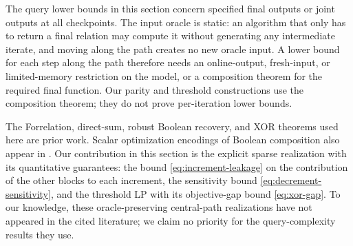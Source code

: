 The query lower bounds in this section concern specified final outputs or
joint outputs at all checkpoints.  The input oracle is static: an
algorithm that only has to return a final relation may compute it without
generating any intermediate iterate, and moving along the path creates no
new oracle input.  A lower bound for each step along the path therefore
needs an online-output, fresh-input, or limited-memory restriction on the
model, or a composition theorem for the required final function.  Our parity and threshold constructions use
the composition theorem; they do not prove per-iteration lower bounds.

The Forrelation, direct-sum, robust Boolean recovery, and XOR theorems used
here are prior work.  Scalar optimization encodings of Boolean composition
also appear in \citet{ApersGribling2026}.  Our
contribution in this section is the explicit sparse realization with its
quantitative guarantees: the bound \eqref{eq:increment-leakage} on the
contribution of the other blocks to each increment, the sensitivity bound
\eqref{eq:decrement-sensitivity}, and the threshold LP with its
objective-gap bound \eqref{eq:xor-gap}.  To our
knowledge, these oracle-preserving central-path realizations have not
appeared in the cited literature; we claim no priority for the
query-complexity results they use.
